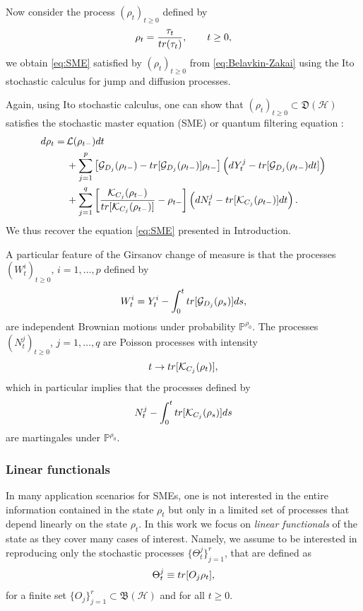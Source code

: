 \documentclass[aihp,12pt]{imsart}
\newcommand{\Gc}{\mathcal{G}}
\newcommand{\Hc}{\mathcal{H}}
\newcommand{\Kc}{\mathcal{K}}
\newcommand{\Lc}{\mathcal{L}}
\newcommand{\Bf}{\mathfrak{B}}
\newcommand{\Df}{\mathfrak{D}}
\newcommand{\tr}{{\rm tr}}
\theoremstyle{theorem}
\theoremstyle{definition}
\theoremstyle{remark}
\begin{document}
Now consider the process $(\rho_t)_{t\geq0}$ defined by 
$$\rho_t=\frac{\tau_t}{\tr(\tau_t)},\qquad t\geq0,$$ we obtain \eqref{eq:SME} satisfied by $(\rho_t)_{t\geq0}$ from \eqref{eq:Belavkin-Zakai}
using the Ito stochastic calculus for jump and diffusion processes.

Again, using Ito stochastic calculus, one can show that $(\rho_t)_{t\geq0}\subset\Df(\Hc)$ satisfies the stochastic master equation (SME) \cite{barchielli2009quantum,bouten2007introduction} or quantum filtering equation \cite{BELAVKIN1992171}:
\begin{equation}
    \begin{split}
        d\rho_t =\,& \Lc(\rho_{t-}) dt\\& + \sum_{j=1}^{p} \left[ \Gc_{D_j}(\rho_{t-}) -\tr[\Gc_{D_j}(\rho_{t-})]\rho_{t-} \right] \left(dY_t^j-\tr[\Gc_{D_j}(\rho_{t-})dt]\right)\\&  + \sum_{j=1}^{q}\left[\frac{\Kc_{C_j}(\rho_{t-})}{\tr[\Kc_{C_j}(\rho_{t-})]}-\rho_{t-}\right]\left(dN_t^j-\tr[\Kc_{C_j}(\rho_{t-})]dt\right).
    \end{split}
    \label{eq:SME_2}
\end{equation}
We thus recover the equation \eqref{eq:SME} presented in Introduction. 

A particular feature of the Girsanov change of measure is that the processes $(W_t^i)_{t\geq0}$, $i=1,\ldots,p$ defined by
$$W_t^i = Y_t^i-\int_0^t\tr[\Gc_{D_j}(\rho_s)]ds,$$
are independent Brownian motions under probability $\mathbb P^{\rho_0}$. The processes $(N_t^j)_{t\geq0}$, $j=1,\ldots,q$ are Poisson processes with intensity
$$t\rightarrow \tr[\Kc_{C_j}(\rho_t)],$$ which in particular implies that the processes defined by
$$N_t^j-\int_0^t\tr[\Kc_{C_j}(\rho_s)]ds$$ are martingales under $\mathbb P^{\rho_0}.$

\subsubsection{Linear functionals}

In many application scenarios for SMEs, one is not interested in the entire information contained in the state $\rho_t$ but only in a limited set of processes that depend linearly on the state $\rho_t$. In this work we focus on \textit{linear functionals} of the state as they cover many cases of interest. Namely, we assume to be interested in reproducing only the stochastic processes $\{\Theta_t^j\}_{j=1}^r$, that are defined as 
\begin{equation}
    \Theta_t^j \equiv \tr[O_j\rho_t],
    \label{eq:output}
\end{equation} for a finite set $\{O_j\}_{j=1}^r\subset\Bf(\Hc)$ and for all $t\geq0$. 
\end{document}
